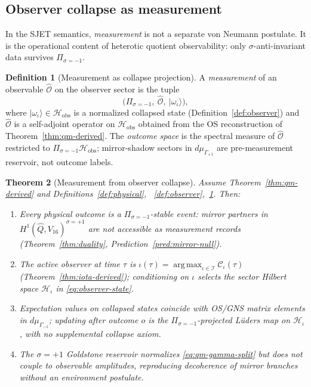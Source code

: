 \documentclass[aps,prd,onecolumn,amsmath,amssymb,nofootinbib,11pt]{revtex4-2}
\numberwithin{equation}{section}
\theoremstyle{plain}
\newtheorem{theorem}{Theorem}[section]
\theoremstyle{definition}
\newtheorem{definition}[theorem]{Definition}
\theoremstyle{remark}
\newcommand{\capacity}{\mathcal{C}}
\DeclareMathOperator{\argmax}{arg\,max}
\begin{document}
\subsection{Observer collapse as measurement}

In the SJET semantics, \emph{measurement} is not a separate von Neumann
postulate. It is the operational content of heterotic quotient
observability: only $\sigma$-anti-invariant data survives
$\Pi_{\sigma=-1}$.

\begin{definition}[Measurement as collapse projection]\label{def:measurement-collapse}
A \emph{measurement} of an observable $\hat{\mathcal{O}}$ on the observer
sector is the tuple
\begin{equation}\label{eq:measurement-tuple}
  \bigl(\Pi_{\sigma=-1},\ \hat{\mathcal{O}},\ |\omega_\iota\rangle\bigr),
\end{equation}
where $|\omega_\iota\rangle\in\mathcal{H}_{\mathrm{obs}}$ is a normalized
collapsed state (Definition~\ref{def:observer}) and $\hat{\mathcal{O}}$ is a
self-adjoint operator on $\mathcal{H}_{\mathrm{obs}}$ obtained from the OS
reconstruction of Theorem~\ref{thm:qm-derived}. The \emph{outcome space} is the
spectral measure of $\hat{\mathcal{O}}$ restricted to
$\Pi_{\sigma=-1}\mathcal{H}_{\mathrm{obs}}$; mirror-shadow sectors in
$d\mu_{\Gamma_{+1}}$ are pre-measurement reservoir, not outcome labels.
\end{definition}

\begin{theorem}[Measurement from observer collapse]
\label{thm:measurement-collapse}
Assume Theorem~\ref{thm:qm-derived} and Definitions~\ref{def:physical},
~\ref{def:observer},~\ref{def:measurement-collapse}. Then:
\begin{enumerate}[label=(\roman*),leftmargin=*]
  \item Every physical outcome is a $\Pi_{\sigma=-1}$-stable event: mirror
    partners in $H^1(\hat Q,V_{16})^{\sigma=+1}$ are not accessible as
    measurement records (Theorem~\ref{thm:duality},
    Prediction~\ref{pred:mirror-null}).
  \item The active observer at time $\tau$ is
    $\iota(\tau)=\argmax_{\iota\in\mathcal{I}}\capacity_\iota(\tau)$
    (Theorem~\ref{thm:iota-derived}); conditioning on $\iota$ selects the
    sector Hilbert space $\mathcal{H}_\iota$ in \eqref{eq:observer-state}.
  \item Expectation values on collapsed states coincide with OS/GNS matrix
    elements in $d\mu_{\Gamma_{-1}}$; updating after outcome $o$ is the
    $\Pi_{\sigma=-1}$-projected L\"uders map on $\mathcal{H}_\iota$, with no
    supplemental collapse axiom.
  \item The $\sigma=+1$ Goldstone reservoir normalizes
    \eqref{eq:qm-gamma-split} but does not couple to observable amplitudes,
    reproducing decoherence of mirror branches without an environment
    postulate.
\end{enumerate}
\end{theorem}
\end{document}
